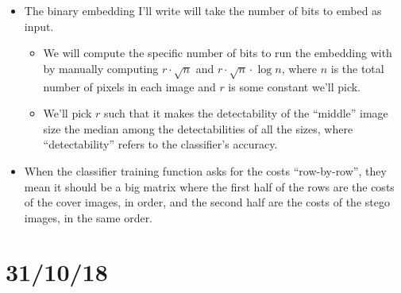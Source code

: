 \documentclass[11pt,a4paper]{report}
\begin{document}
\begin{itemize}
\item The binary embedding I'll write will take the number of bits to embed as input.
  \begin{itemize}
  \item We will compute the specific number of bits to run the embedding with by manually computing $r \cdot \sqrt{n}$ and $r \cdot \sqrt{n} \cdot \log n$, where $n$ is the total number of pixels in each image and $r$ is some constant we'll pick.
  \item We'll pick $r$ such that it makes the detectability of the ``middle'' image size the median among the detectabilities of all the sizes, where ``detectability'' refers to the classifier's accuracy.
  \end{itemize}

\item When the classifier training function asks for the costs ``row-by-row'', they mean it should be a big matrix where the first half of the rows are the costs of the cover images, in order, and the second half are the costs of the stego images, in the same order.

\end{itemize}


\section{31/10/18}
\end{document}
